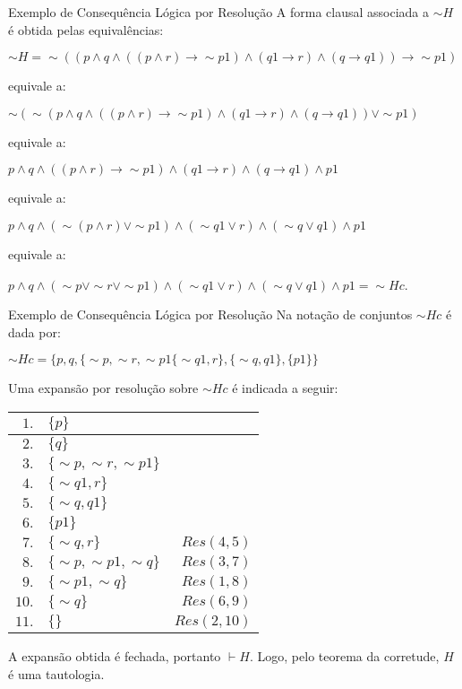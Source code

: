 \begin{frame}{Exemplo de Consequência Lógica por Resolução}
A forma clausal associada a $\sim H$ é obtida pelas equivalências:

$\sim H = \sim((p \wedge q\wedge((p\wedge r)\rightarrow \sim p1)\wedge(q1 \rightarrow r)\wedge (q \rightarrow q1))\rightarrow \sim p1)$

equivale a:

$\sim(\sim(p \wedge q \wedge((p \wedge r)\rightarrow \sim p1)\wedge (q1\rightarrow r) \wedge (q \rightarrow q1)) \vee \sim p1)$

equivale a:

$p \wedge q \wedge ((p \wedge r)\rightarrow \sim p1) \wedge (q1 \rightarrow r) \wedge (q \rightarrow q1) \wedge p1$

equivale a:

$p \wedge q \wedge (\sim(p \wedge r) \vee \sim p1) \wedge (\sim q1 \vee r) \wedge (\sim q \vee q1) \wedge p1$

equivale a:

$p \wedge q \wedge (\sim p \vee \sim r \vee \sim p1) \wedge (\sim q1 \vee r) \wedge (\sim q \vee q1) \wedge p1 = \sim Hc$.
\end{frame}

\begin{frame}{Exemplo de Consequência Lógica por Resolução}
Na notação de conjuntos $\sim Hc$ é dada por:

$\sim Hc = \{p,q,\{\sim p,\sim r,\sim p1\{\sim q1,r\},\{\sim q,q1\},\{p1\}\}$

Uma expansão por resolução sobre $\sim Hc$ é indicada a seguir:
\begin{table}
\centering
\begin{tabular}{r|l|r}
\hline
\hline
$1.$&$\{p\}$&$ $\\
\hline
$2.$&$\{q\}$&$ $\\
\hline
$3.$&$\{\sim p, \sim r, \sim p1\}$&$ $\\
\hline
$4.$&$ \{\sim q1, r\}$&$ $\\
\hline
$5.$& $\{ \sim q, q1\}$&$ $\\
\hline
$6.$&$\{p1\}$&$ $\\
\hline
$7.$&$\{\sim q, r\} $&$Res(4,5)$\\
\hline
$8.$&$\{ \sim p, \sim p1, \sim q\} $&$Res(3,7)$\\
\hline
$9.$&$ \{\sim p1, \sim q\} $&$Res(1,8)$\\
\hline
$10.$&$\{\sim q\} $&$Res(6,9)$\\
\hline
$11.$&$\{ \} $&$Res(2,10)$\\
\hline
\hline
\end{tabular}
\end{table}
A expansão obtida é fechada, portanto $\vdash H$. Logo, pelo teorema da corretude, $H$ é uma tautologia. 
\end{frame}



